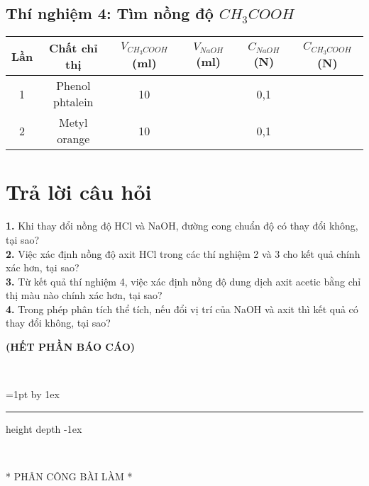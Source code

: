 \subsection{Thí nghiệm 4: Tìm nồng độ $CH_{3}COOH$}
\begin{center}
    \begin{tabular}{|c|c|c|c|c|c|}
        \hline \textbf{Lần} & \textbf{Chất chỉ thị} & $V_{CH_3COOH}$ (ml) & $V_{NaOH}$ (ml) & $C_{NaOH}$ (N) & $C_{CH_3COOH}$ (N)\\
        \hline      1       &  Phenol phtalein      &          10         &                 &     0,1        &                   \\
        \hline      2       &  Metyl orange         &          10         &                 &     0,1        &                    \\
        \hline
    \end{tabular}
\end{center}


\section{Trả lời câu hỏi}

\textbf{1.} Khi thay đổi nồng độ HCl và NaOH, đường cong chuẩn độ có thay đổi không, tại sao? \\

\textbf{2.} Việc xác định nồng độ axit HCl trong các thí nghiệm 2 và 3 cho kết quả chính xác hơn, tại sao?\\

\textbf{3.} Từ kết quả thí nghiệm 4, việc xác định nồng độ dung dịch axit acetic bằng chỉ thị màu nào chính xác hơn, tại sao?\\

\textbf{4.} Trong phép phân tích thể tích, nếu đổi vị trí của NaOH và axit thì kết quả có thay đổi không, tại sao?\\


\begin{center}
    \textbf{(HẾT PHẦN BÁO CÁO)}
\end{center}
\newcommand{\xfill}[2][1ex]{{%
  \dimen0=#2\advance\dimen0 by #1
  \leaders\hrule height  depth -#1\hfill%
}}

\ \xfill{1pt} \

* PHÂN CÔNG BÀI LÀM *
